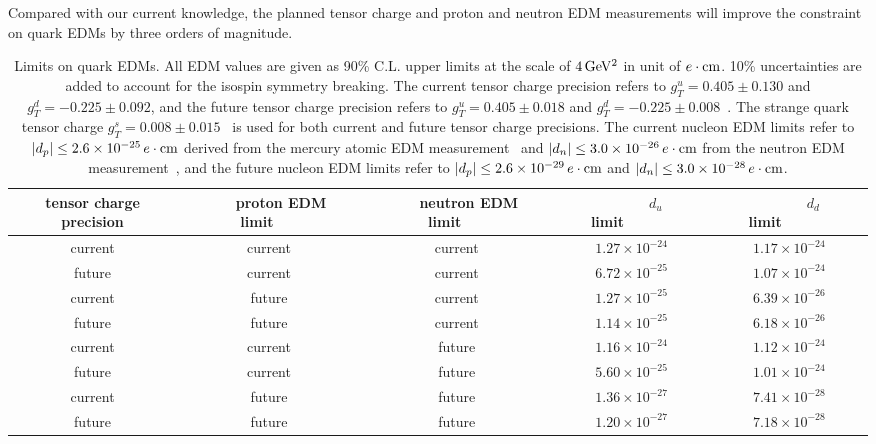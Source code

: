 \documentclass[aps,prd,twocolumn,groupedaddress,showpacs,superscriptaddress,floatfix,nofootinbib,10pt]{revtex4-1}
\begin{document}
Compared with our current knowledge, the planned tensor charge and proton and neutron EDM measurements will improve the constraint on quark EDMs by three orders of magnitude.

\begin{table*}[htp]
\centering
\caption{Limits on quark EDMs. All EDM values are given as 90\% C.L. upper limits at the scale of $4\,\rm GeV^2$ in unit of $e\cdot{\rm cm}$. 10\% uncertainties are added to account for the isospin symmetry breaking. The current tensor charge precision refers to $g_T^{u}=0.405\pm0.130$ and $g_T^{d}=-0.225\pm0.092$, and the future tensor charge precision refers to $g_T^u=0.405\pm0.018$ and $g_T^d=-0.225\pm0.008$~\cite{Ye:2016prn}. The strange quark tensor charge $g_T^{s}=0.008\pm0.015$~\cite{Bhattacharya:2015esa} is used for both current and future tensor charge precisions. The current nucleon EDM limits refer to $|d_p|\leq2.6\times10^{-25}\,e\cdot{\rm cm}$ derived from the mercury atomic EDM measurement~\cite{Graner:2016ses} and $|d_n|\leq3.0\times10^{-26}\,e\cdot{\rm cm}$ from the neutron EDM measurement~\cite{Afach:2015sja}, and the future nucleon EDM limits refer to $|d_p|\leq2.6\times10^{-29}\,e\cdot{\rm cm}$ and $|d_n|\leq3.0\times10^{-28}\,e\cdot{\rm cm}$.}\label{quark_edm}
\begin{tabular}{ccccc}
\hline\hline
tensor charge precision & ~~~proton EDM limit~~~ & ~~~neutron EDM limit~~~ & ~~~~~~$d_u$ limit~~~~~~ & ~~~~~~$d_d$ limit~~~~~~\\
\hline
current & current & current & $1.27\times10^{-24}$ & $1.17\times10^{-24}$ \\
future & current & current & $6.72\times10^{-25}$ & $1.07\times10^{-24}$ \\
current & future & current & $1.27\times10^{-25}$ & $6.39\times10^{-26}$ \\
future & future & current & $1.14\times10^{-25}$ & $6.18\times10^{-26}$ \\
current & current & future & $1.16\times10^{-24}$ & $1.12\times10^{-24}$ \\
future & current & future & $5.60\times10^{-25}$ & $1.01\times10^{-24}$ \\
current & future & future & $1.36\times10^{-27}$ & $7.41\times10^{-28}$ \\
future & future & future & $1.20\times10^{-27}$ & $7.18\times10^{-28}$ \\
\hline\hline
\end{tabular}
\end{table*}
\end{document}

